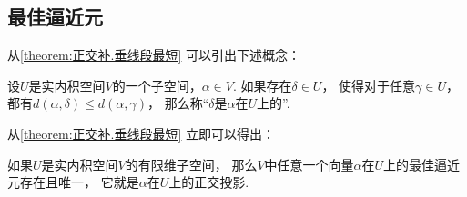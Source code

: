 \subsection{最佳逼近元}
从\cref{theorem:正交补.垂线段最短} 可以引出下述概念：
\begin{definition}
设\(U\)是实内积空间\(V\)的一个子空间，\(\alpha \in V\).
如果存在\(\delta \in U\)，
使得对于任意\(\gamma \in U\)，
都有\(d(\alpha,\delta) \leq d(\alpha,\gamma)\)，
那么称“\(\delta\)是\(\alpha\)在\(U\)上的”.
\end{definition}

从\cref{theorem:正交补.垂线段最短} 立即可以得出：
\begin{proposition}
如果\(U\)是实内积空间\(V\)的有限维子空间，
那么\(V\)中任意一个向量\(\alpha\)在\(U\)上的最佳逼近元存在且唯一，
它就是\(\alpha\)在\(U\)上的正交投影.
\end{proposition}

